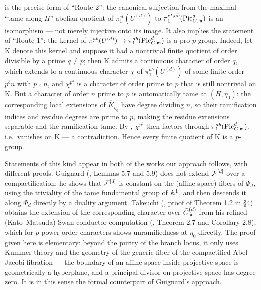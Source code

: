\begin{rem*}
     is the precise form of ``Route 2'': the canonical
    surjection from the maximal ``tame-along-$H$'' abelian quotient of
    $\pi_1^{et}(U^{(d)})$ to $\pi_1^{et, ab}(\PicCm[d])$ is an isomorphism --- not merely
    injective onto its image. It also implies the statement of ``Route 1'': the kernel of
    $\pi_1^{ab}(U^{(d)}) \to \pi_1^{ab}(\PicCm[d])$ is a pro-$p$ group. Indeed, let
    $\mathrm{K}$ denote this kernel and suppose it had a nontrivial finite quotient of order
    divisible by a prime $q \neq p$; then $\mathrm{K}$ admits a continuous character of order
    $q$, which extends to a continuous character $\chi$ of $\pi_1^{ab}(U^{(d)})$ of some
    finite order $p^b n$ with $p \nmid n$, and $\chi^{p^b}$ is a character of order prime to
    $p$ that is still nontrivial on $\mathrm{K}$. But a character of order $n$ prime to $p$
    is automatically tame at $(H, \eta_0)$: the corresponding local extensions of
    $\widehat{K}_{\eta_0}$ have degree dividing $n$, so their ramification indices and residue
    degrees are prime to $p$, making the residue extensions separable and the ramification
    tame. By , $\chi^{p^b}$ then factors through
    $\pi_1^{ab}(\PicCm[d])$, i.e.\ vanishes on $\mathrm{K}$ --- a contradiction. Hence every
    finite quotient of $\mathrm{K}$ is a $p$-group.
\end{rem*}

\begin{rem*}
    Statements of this kind appear in both of the works our approach follows, with different
    proofs. Guignard (\cite{Guignard2018}, Lemmas 5.7 and 5.9) does not extend $\cF^{[d]}$
    over a compactification: he shows that $\cF^{[d]}$ is constant on the (affine space)
    fibers of $\Phi_d$, using the triviality of the tame fundamental group of $\A^1$, and then
    descends it along $\Phi_d$ directly by a duality argument. Takeuchi
    (\cite{takeuchi2019blow}, proof of Theorem 1.2 in \S 4) obtains the extension of the
    corresponding character over $\Cmod{d}$ from his refined (Kato--Matsuda) Swan conductor
    computation (\cite{takeuchi2019blow}, Theorem 2.7 and Corollary 2.8), which for $p$-power
    order characters shows unramifiedness at $\eta_0$ directly. The proof given here is
    elementary: beyond the purity of the branch locus, it only uses Kummer theory and the
    geometry of the generic fiber of the compactified Abel--Jacobi fibration --- the boundary
    of an affine space inside projective space is geometrically a hyperplane, and a principal
    divisor on projective space has degree zero. It is in this sense the formal counterpart of
    Guignard's approach.
\end{rem*}
